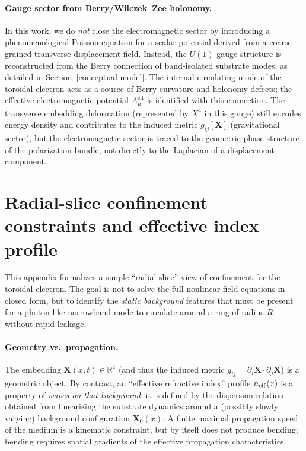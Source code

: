 \paragraph{Gauge sector from Berry/Wilczek--Zee holonomy.}

In this work, we do \emph{not} close the electromagnetic
sector by introducing a phenomenological Poisson equation for a scalar
potential derived from a coarse-grained transverse-displacement field.
Instead, the $U(1)$ gauge structure is reconstructed from the Berry
connection of band-isolated substrate modes, as detailed in
Section~\ref{conceptual-model}. The internal circulating mode of the
toroidal electron acts as a source of Berry curvature and
holonomy defects; the effective electromagnetic potential $A_\mu^{\text{eff}}$
is identified with this connection. The transverse embedding
deformation (represented by $X^4$ in this gauge) still encodes energy density and contributes to the
induced metric $g_{ij}[\mathbf{X}]$ (gravitational sector), but the
electromagnetic sector is traced to the geometric phase structure of
the polarization bundle, not directly to the Laplacian of a displacement component.


\section{Radial-slice confinement constraints and effective index profile}
\label{app:confinement-slice}

This appendix formalizes a simple ``radial slice'' view of confinement for the toroidal electron.
The goal is not to solve the full nonlinear field equations in closed form, but to identify the
\emph{static background} features that must be present for a photon-like narrowband mode to circulate
around a ring of radius $R$ without rapid leakage.

\paragraph{Geometry vs.\ propagation.}
The embedding $\mathbf X(x,t)\in\mathbb R^4$ (and thus the induced metric $g_{ij}=\partial_i\mathbf X\cdot\partial_j\mathbf X$)
is a geometric object. By contrast, an ``effective refractive index'' profile $n_{\rm eff}(x)$ is a
property of \emph{waves on that background}: it is defined by the dispersion relation obtained from
linearizing the substrate dynamics around a (possibly slowly varying) background configuration
$\mathbf X_0(x)$.
A finite maximal propagation speed of the medium is a kinematic constraint, but by itself does not
produce bending; bending requires spatial gradients of the effective propagation characteristics.

